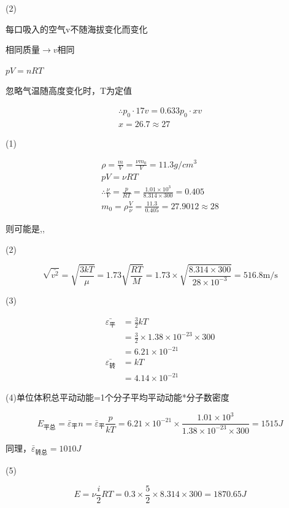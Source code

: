 \documentclass[b5paper,opensource]{./template/qyxf-book}
\begin{document}
(2)

每口吸入的空气v不随海拔变化而变化

相同质量$\rightarrow v $相同

$pV=nRT$

忽略气温随高度变化时，T为定值

$$
\begin{array}{l}
\therefore p_{0}\cdot 17 v =0.633p_0 \cdot x v\\
{ x = 26.7 \approx 27} 
\end{array}
$$


\solve

(1)

$$
\begin{array} { c } { \rho = \frac { m } { V } = \frac { \nu m _ { 0 } } { V } = 11.3 g / c m ^ { 3 } } \\ { p V = \nu R T } \\ { \therefore \frac { \nu } { V } = \frac { p } { R T } = \frac { 1.01 \times 10 ^ { 3 } } { 8.314 \times 300 } = 0.405 } \\ { m _ { 0 } = \rho \frac { V } { \nu } = \frac { 11.3 } { 0.405 } = 27.9012 \approx 28 } \end{array}
$$

则可能是,,

(2)

$$
\sqrt{\bar{v^{2}}}=\sqrt {\frac{3kT}{\mu}}=1.73\sqrt {\frac{RT}{M}}=1.73\times\sqrt{\frac{8.314\times 300}{28\times10^{-3}}}=516.8\mathrm{m}/\mathrm{s}
$$

(3)

\begin{align*}
\bar{\varepsilon_{\mbox{平}}}&=\frac{3}{2}kT\\
&=\frac{3}{2}\times 1.38\times 10^{-23}\times 300\\
&=6.21\times 10^{-21}\\
\bar{\varepsilon_{\mbox{转}}}&=kT\\
&=4.14\times 10^{-21}
\end{align*}

(4)单位体积总平动动能=1个分子平均平动动能*分子数密度

$$E_{\mbox{平总}}=\bar { \varepsilon } _ {\mbox{平}}n=\bar { \varepsilon } _ {\mbox{平}}\frac{p}{kT}=6.21 \times 10 ^ { - 21 } \times \frac { 1.01 \times 10 ^ { 3 } } { 1.38 \times 10 ^ { - 23 } \times 300 } = 1515 J$$

同理，$\bar { \varepsilon } _ {\mbox{转总}}=1010J$

(5)

$$
E = \nu \frac { i } { 2 } R T = 0.3 \times \frac { 5 } { 2 } \times 8.314 \times 300 = 1870.65 J
$$
\end{document}
